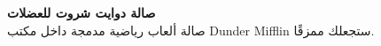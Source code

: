 {\textbf{صالة دوايت شروت للعضلات}}\\
صالة ألعاب رياضية مدمجة داخل مكتب \foreignlanguage{english}{Dunder Mifflin} ستجعلك ممزقًا.\\
\vspace*{2mm}